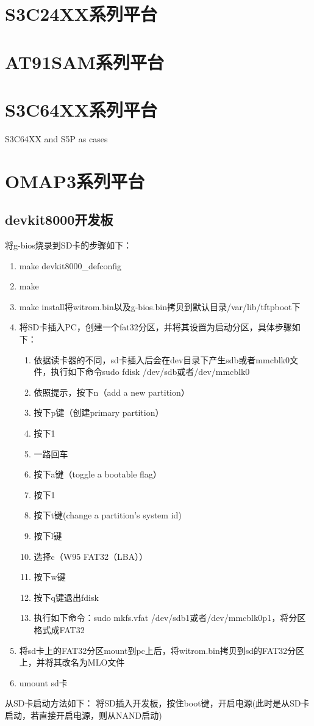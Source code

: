 \section{S3C24XX系列平台}

\section{AT91SAM系列平台}

\section{S3C64XX系列平台}
S3C64XX and S5P as cases

\section{OMAP3系列平台}
\subsection{devkit8000开发板}
将g-bios烧录到SD卡的步骤如下：
\begin{enumerate}
\item make devkit8000\_defconfig
\item make
\item make install将witrom.bin以及g-bios.bin拷贝到默认目录/var/lib/tftpboot下
\item 将SD卡插入PC，创建一个fat32分区，并将其设置为启动分区，具体步骤如下：
 \begin{enumerate}
  \item 依据读卡器的不同，sd卡插入后会在dev目录下产生sdb或者mmcblk0文件，执行如下命令sudo fdisk /dev/sdb或者/dev/mmcblk0
  \item 依照提示，按下n（add a new partition）
  \item 按下p键（创建primary partition）
  \item 按下1
  \item 一路回车
  \item 按下a键（toggle a bootable flag）
  \item 按下1
  \item 按下t键(change a partition's system id)
  \item 按下l键
  \item 选择c（W95 FAT32（LBA））
  \item 按下w键
  \item 按下q键退出fdisk
  \item 执行如下命令：sudo mkfs.vfat /dev/sdb1或者/dev/mmcblk0p1，将分区格式成FAT32
 \end{enumerate}
\item 将sd卡上的FAT32分区mount到pc上后，将witrom.bin拷贝到sd的FAT32分区上，并将其改名为MLO文件
\item umount sd卡
\end{enumerate}
从SD卡启动方法如下：
将SD插入开发板，按住boot键，开启电源(此时是从SD卡启动，若直接开启电源，则从NAND启动)
